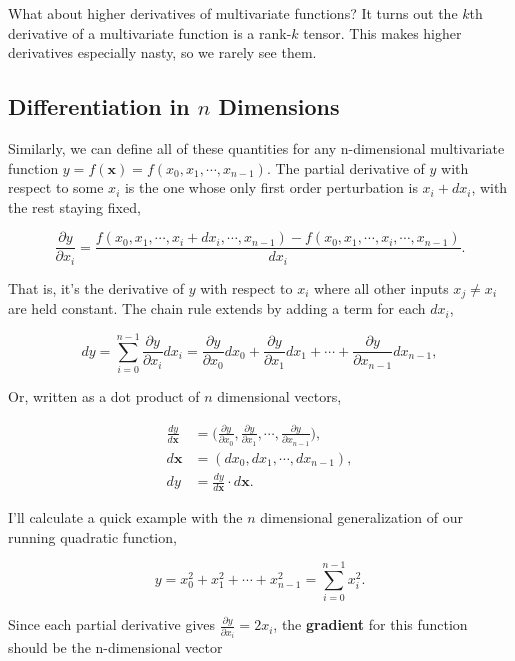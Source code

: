 \documentclass[
  letterpaper,
  DIV=11,
  numbers=noendperiod]{scrreprt}
\begin{document}
What about higher derivatives of multivariate functions? It turns out
the \(k\)th derivative of a multivariate function is a rank-\(k\)
tensor. This makes higher derivatives especially nasty, so we rarely see
them.

\hypertarget{differentiation-in-n-dimensions}{%
\subsection{\texorpdfstring{Differentiation in \(n\)
Dimensions}{Differentiation in n Dimensions}}\label{differentiation-in-n-dimensions}}

Similarly, we can define all of these quantities for any n-dimensional
multivariate function \(y=f(\mathbf{x})=f(x_0,x_1,\cdots,x_{n-1}).\) The
partial derivative of \(y\) with respect to some \(x_i\) is the one
whose only first order perturbation is \(x_i+dx_i\), with the rest
staying fixed,

\[\frac{\partial y}{\partial x_i} = \frac{f(x_0,x_1,\cdots,x_i+dx_i,\cdots,x_{n-1}) - f(x_0,x_1,\cdots,x_i,\cdots,x_{n-1})}{dx_i}.\]

That is, it's the derivative of \(y\) with respect to \(x_i\) where all
other inputs \(x_j \neq x_i\) are held constant. The chain rule extends
by adding a term for each \(dx_i\),

\[dy = \sum_{i=0}^{n-1} \frac{\partial y}{\partial x_i} dx_i = \frac{\partial y}{\partial x_0} dx_0 + \frac{\partial y}{\partial x_1} dx_1 + \cdots + \frac{\partial y}{\partial x_{n-1}} dx_{n-1},\]

Or, written as a dot product of \(n\) dimensional vectors,

\begin{align*}
\frac{dy}{d\mathbf{x}} &= \bigg(\frac{\partial y}{\partial x_0}, \frac{\partial y}{\partial x_1},\cdots,\frac{\partial y}{\partial x_{n-1}} \bigg), \\
d\mathbf{x} &= (dx_0, dx_1,\cdots,dx_{n-1}), \\
dy &= \frac{dy}{d\mathbf{x}} \cdot d\mathbf{x}.
\end{align*}

I'll calculate a quick example with the \(n\) dimensional generalization
of our running quadratic function,

\[y = x_0^2 + x_1^2 + \cdots + x_{n-1}^2 = \sum_{i=0}^{n-1} x_i^2.\]

Since each partial derivative gives
\(\frac{\partial y}{\partial x_i} = 2x_i\), the \textbf{gradient} for
this function should be the n-dimensional vector
\end{document}
